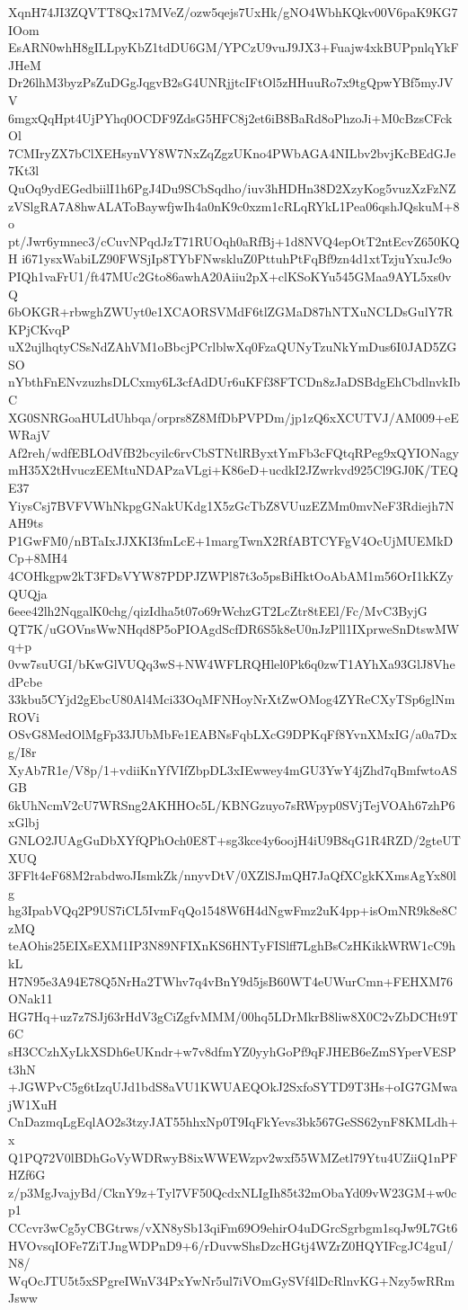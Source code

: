 XqnH74JI3ZQVTT8Qx17MVeZ/ozw5qejs7UxHk/gNO4WbhKQkv00V6paK9KG7IOom
EsARN0whH8gILLpyKbZ1tdDU6GM/YPCzU9vuJ9JX3+Fuajw4xkBUPpnlqYkFJHeM
Dr26lhM3byzPsZuDGgJqgvB2sG4UNRjjtcIFtOl5zHHuuRo7x9tgQpwYBf5myJVV
6mgxQqHpt4UjPYhq0OCDF9ZdsG5HFC8j2et6iB8BaRd8oPhzoJi+M0cBzsCFckOl
7CMIryZX7bClXEHsynVY8W7NxZqZgzUKno4PWbAGA4NILbv2bvjKcBEdGJe7Kt3l
QuOq9ydEGedbiilI1h6PgJ4Du9SCbSqdho/iuv3hHDHn38D2XzyKog5vuzXzFzNZ
zVSlgRA7A8hwALAToBaywfjwIh4a0nK9c0xzm1cRLqRYkL1Pea06qshJQskuM+8o
pt/Jwr6ymnec3/cCuvNPqdJzT71RUOqh0aRfBj+1d8NVQ4epOtT2ntEcvZ650KQH
i671ysxWabiLZ90FWSjIp8TYbFNwskluZ0PttuhPtFqBf9zn4d1xtTzjuYxuJc9o
PIQh1vaFrU1/ft47MUc2Gto86awhA20Aiiu2pX+clKSoKYu545GMaa9AYL5xs0vQ
6bOKGR+rbwghZWUyt0e1XCAORSVMdF6tlZGMaD87hNTXuNCLDsGulY7RKPjCKvqP
uX2ujlhqtyCSsNdZAhVM1oBbcjPCrlblwXq0FzaQUNyTzuNkYmDus6I0JAD5ZGSO
nYbthFnENvzuzhsDLCxmy6L3cfAdDUr6uKFf38FTCDn8zJaDSBdgEhCbdlnvkIbC
XG0SNRGoaHULdUhbqa/orprs8Z8MfDbPVPDm/jp1zQ6xXCUTVJ/AM009+eEWRajV
Af2reh/wdfEBLOdVfB2bcyilc6rvCbSTNtlRByxtYmFb3cFQtqRPeg9xQYIONagy
mH35X2tHvuczEEMtuNDAPzaVLgi+K86eD+ucdkI2JZwrkvd925Cl9GJ0K/TEQE37
YiysCsj7BVFVWhNkpgGNakUKdg1X5zGcTbZ8VUuzEZMm0mvNeF3Rdiejh7NAH9ts
P1GwFM0/nBTaIxJJXKI3fmLcE+1margTwnX2RfABTCYFgV4OcUjMUEMkDCp+8MH4
4COHkgpw2kT3FDsVYW87PDPJZWPl87t3o5psBiHktOoAbAM1m56OrI1kKZyQUQja
6eee42lh2NqgalK0chg/qizIdha5t07o69rWchzGT2LcZtr8tEEl/Fc/MvC3ByjG
QT7K/uGOVnsWwNHqd8P5oPIOAgdScfDR6S5k8eU0nJzPll1IXprweSnDtswMWq+p
0vw7suUGI/bKwGlVUQq3wS+NW4WFLRQHlel0Pk6q0zwT1AYhXa93GlJ8VhedPcbe
33kbu5CYjd2gEbcU80Al4Mci33OqMFNHoyNrXtZwOMog4ZYReCXyTSp6glNmROVi
OSvG8MedOlMgFp33JUbMbFe1EABNsFqbLXcG9DPKqFf8YvnXMxIG/a0a7Dxg/I8r
XyAb7R1e/V8p/1+vdiiKnYfVIfZbpDL3xIEwwey4mGU3YwY4jZhd7qBmfwtoASGB
6kUhNcmV2cU7WRSng2AKHHOc5L/KBNGzuyo7sRWpyp0SVjTejVOAh67zhP6xGlbj
GNLO2JUAgGuDbXYfQPhOch0E8T+sg3kce4y6oojH4iU9B8qG1R4RZD/2gteUTXUQ
3FFlt4eF68M2rabdwoJIsmkZk/nnyvDtV/0XZlSJmQH7JaQfXCgkKXmsAgYx80lg
hg3IpabVQq2P9US7iCL5IvmFqQo1548W6H4dNgwFmz2uK4pp+isOmNR9k8e8CzMQ
teAOhis25EIXsEXM1IP3N89NFIXnKS6HNTyFISlff7LghBsCzHKikkWRW1cC9hkL
H7N95e3A94E78Q5NrHa2TWhv7q4vBnY9d5jsB60WT4eUWurCmn+FEHXM76ONak11
HG7Hq+uz7z7SJj63rHdV3gCiZgfvMMM/00hq5LDrMkrB8liw8X0C2vZbDCHt9T6C
sH3CCzhXyLkXSDh6eUKndr+w7v8dfmYZ0yyhGoPf9qFJHEB6eZmSYperVESPt3hN
+JGWPvC5g6tIzqUJd1bdS8aVU1KWUAEQOkJ2SxfoSYTD9T3Hs+oIG7GMwajW1XuH
CnDazmqLgEqlAO2s3tzyJAT55hhxNp0T9IqFkYevs3bk567GeSS62ynF8KMLdh+x
Q1PQ72V0lBDhGoVyWDRwyB8ixWWEWzpv2wxf55WMZetl79Ytu4UZiiQ1nPFHZf6G
z/p3MgJvajyBd/CknY9z+Tyl7VF50QcdxNLIgIh85t32mObaYd09vW23GM+w0cp1
CCcvr3wCg5yCBGtrws/vXN8ySb13qiFm69O9ehirO4uDGrcSgrbgm1sqJw9L7Gt6
HVOvsqIOFe7ZiTJngWDPnD9+6/rDuvwShsDzcHGtj4WZrZ0HQYIFcgJC4guI/N8/
WqOcJTU5t5xSPgreIWnV34PxYwNr5ul7iVOmGySVf4lDcRlnvKG+Nzy5wRRmJsww
